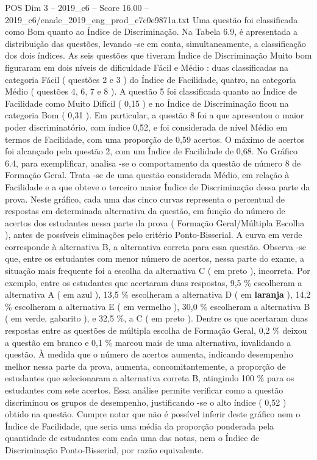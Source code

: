 \begin{textsample}{POS Dim 3 – 2019\_c6 – Score 16.00 – 2019\_c6/enade\_2019\_eng\_prod\_c7c0e9871a.txt}
Uma questão foi classificada como Bom quanto ao Índice de Discriminação.
Na Tabela 6.9, é apresentada a distribuição das questões, levando -se em conta, simultaneamente, a classificação dos dois índices.
As seis questões que tiveram Índice de Discriminação Muito bom figuraram em dois níveis de dificuldade Fácil e Médio : duas classificadas na categoria Fácil ( questões 2 e 3 ) do Índice de Facilidade, quatro, na categoria Médio ( questões 4, 6, 7 e 8 ).
A questão 5 foi classificada quanto ao Índice de Facilidade como Muito Difícil ( 0,15 ) e no Índice de Discriminação ficou na categoria Bom ( 0,31 ).
Em particular, a questão 8 foi a que apresentou o maior poder discriminatório, com índice 0,52, e foi considerada de nível Médio em termos de Facilidade, com uma proporção de 0,59 acertos.
O máximo de acertos foi alcançado pela questão 2, com um Índice de Facilidade de 0,68.
No Gráfico 6.4, para exemplificar, analisa -se o comportamento da questão de número 8 de Formação Geral.
Trata -se de uma questão considerada Médio, em relação à Facilidade e a que obteve o terceiro maior Índice de Discriminação dessa parte da prova.
Neste gráfico, cada uma das cinco curvas representa o percentual de respostas em determinada alternativa da questão, em função do número de acertos dos estudantes nessa parte da prova ( Formação Geral/Múltipla Escolha ), antes de possíveis eliminações pelo critério Ponto-Bisserial.
A curva em verde corresponde à alternativa B, a alternativa correta para essa questão.
Observa -se que, entre os estudantes com menor número de acertos, nessa parte do exame, a situação mais frequente foi a escolha da alternativa C ( em preto ), incorreta.
Por exemplo, entre os estudantes que acertaram duas respostas, 9,5 \% escolheram a alternativa A ( em azul ), 13,5 \% escolheram a alternativa D ( em \textbf{laranja} ), 14,2 \% escolheram a alternativa E ( em vermelho ), 30,0 \% escolheram a alternativa B ( em verde, gabarito ), e 32,5 \%, a C ( em preto ).
Dentre os que acertaram duas respostas entre as questões de múltipla escolha de Formação Geral, 0,2 \% deixou a questão em branco e 0,1 \% marcou mais de uma alternativa, invalidando a questão.
À medida que o número de acertos aumenta, indicando desempenho melhor nessa parte da prova, aumenta, concomitantemente, a proporção de estudantes que selecionaram a alternativa correta B, atingindo 100 \% para os estudantes com sete acertos.
Essa análise permite verificar como a questão discriminou os grupos de desempenho, justificando -se o alto índice ( 0,52 ) obtido na questão.
Cumpre notar que não é possível inferir deste gráfico nem o Índice de Facilidade, que seria uma média da proporção ponderada pela quantidade de estudantes com cada uma das notas, nem o Índice de Discriminação Ponto-Bisserial, por razão equivalente.

\end{textsample}
